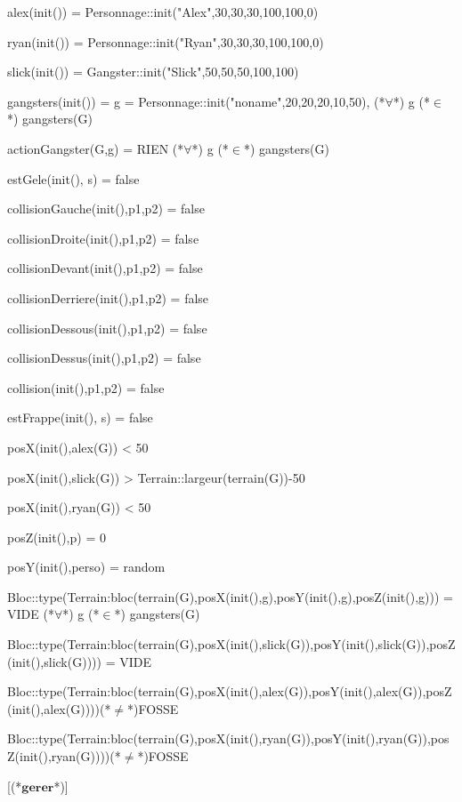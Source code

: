 \documentclass[a4paper, 11pt, notitlepage]{report}
\newcommand{\specB}[1]{\textbf{#1}}
\begin{document}
\begin{landscape}
\begin{Spe}
	alex(init()) = Personnage::init("Alex",30,30,30,100,100,0)
	
	ryan(init()) = Personnage::init("Ryan",30,30,30,100,100,0)
	
	slick(init()) = Gangster::init("Slick",50,50,50,100,100)
	
	gangsters(init()) = {g = Personnage::init("noname",20,20,20,10,50)}, (*$\forall$*) g (*$\in$*) gangsters(G)
	
	actionGangster(G,g) = RIEN (*$\forall$*) g (*$\in$*) gangsters(G)
	
	estGele(init(), s) = false
	
	collisionGauche(init(),p1,p2) = false
	
	collisionDroite(init(),p1,p2) = false
	
	collisionDevant(init(),p1,p2) = false
	
	collisionDerriere(init(),p1,p2) = false
	
	collisionDessous(init(),p1,p2) = false
	
	collisionDessus(init(),p1,p2) = false
	
	collision(init(),p1,p2) = false
	
	estFrappe(init(), s) = false
	
	posX(init(),alex(G)) < 50
	
	posX(init(),slick(G)) > Terrain::largeur(terrain(G))-50
	
	posX(init(),ryan(G)) < 50
	
	posZ(init(),p) = 0
	
	posY(init(),perso) = random
	
	Bloc::type(Terrain:bloc(terrain(G),posX(init(),g),posY(init(),g),posZ(init(),g))) = VIDE (*$\forall$*) g (*$\in$*) gangsters(G)
	
	Bloc::type(Terrain:bloc(terrain(G),posX(init(),slick(G)),posY(init(),slick(G)),posZ(init(),slick(G)))) = VIDE
	
	Bloc::type(Terrain:bloc(terrain(G),posX(init(),alex(G)),posY(init(),alex(G)),posZ(init(),alex(G))))(*$\ne$*)FOSSE
	
	Bloc::type(Terrain:bloc(terrain(G),posX(init(),ryan(G)),posY(init(),ryan(G)),posZ(init(),ryan(G))))(*$\ne$*)FOSSE


	 [(*$\specB{gerer}$*)]
	 

\end{Spe}
\end{landscape}
\end{document}
